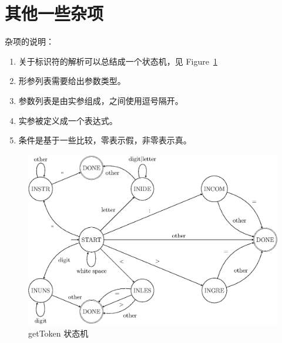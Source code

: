 \section{其他一些杂项}









杂项的说明：
\begin{enumerate}
	\item 关于标识符的解析可以总结成一个状态机，见 Figure~\ref{getToken}
	\item 形参列表需要给出参数类型。
	\item 参数列表是由实参组成，之间使用逗号隔开。
	\item 实参被定义成一个表达式。
	\item 条件是基于一些比较，零表示假，非零表示真。
\end{enumerate}
\begin{figure}[!h]
\begin{center}
    \includegraphics[scale=.8]{Figures/getToken.eps}
\end{center}
\caption{getToken 状态机}
\label{getToken}
\end{figure}

